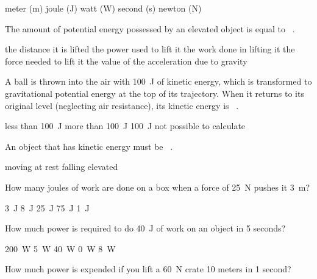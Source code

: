 \documentclass{exam}
\begin{document}
\begin{questions}
\begin{randomizeoneparchoices}
\choice meter (m)
\choice joule (J)
\correctchoice watt (W)
\choice second (s)
\choice newton (N)
\end{randomizeoneparchoices}

\question
The amount of potential energy possessed by an elevated object is equal to \fillin\ .

\begin{randomizechoices}
\choice the distance it is lifted
\choice the power used to lift it
\correctchoice the work done in lifting it
\choice the force needed to lift it
\choice the value of the acceleration due to gravity
\end{randomizechoices}

\question
A  ball is thrown into the air with \SI{100}{J} of kinetic energy, which is transformed to gravitational potential energy at the top of its trajectory. When it returns to its original level (neglecting air resistance), its kinetic energy is \fillin\ .

\begin{randomizeoneparchoices}
\choice less than \SI{100}{J}
\choice more than \SI{100}{J}
\correctchoice \SI{100}{J}
\choice not possible to calculate
\end{randomizeoneparchoices}

\question
An object that has kinetic energy must be \fillin\ .

\begin{randomizeoneparchoices}
\correctchoice moving
\choice at rest
\choice falling
\choice elevated
\end{randomizeoneparchoices}

\question
How many joules of work are done on a box when a force of \SI{25}{N} pushes it \SI{3}{m}?

\begin{randomizeoneparchoices}
\choice \SI{3}{J}
\choice \SI{8}{J}
\choice \SI{25}{J}
\correctchoice \SI{75}{J}
\choice \SI{1}{J}
\end{randomizeoneparchoices}

\question
How much power is required to do \SI{40}{J} of work on an object in 5 seconds?

\begin{randomizeoneparchoices}
\choice \SI{200}{W}
\choice \SI{5}{W}
\choice \SI{40}{W}
\choice \SI{0}{W}
\correctchoice \SI{8}{W}
\end{randomizeoneparchoices}

\question
How much power is expended if you lift a \SI{60}{N} crate 10 meters in 1 second?


\end{questions}
\end{document}
